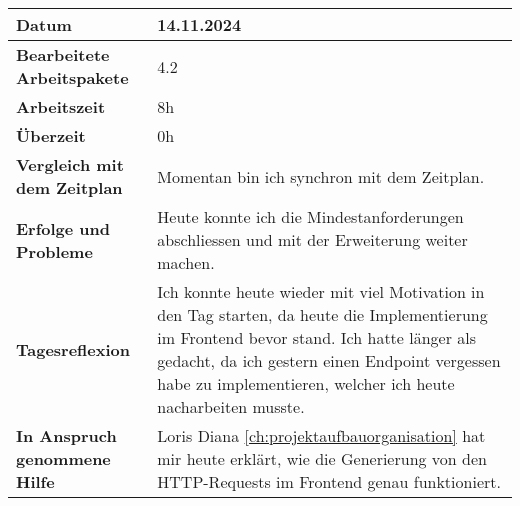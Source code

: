 \begin{longtable}{p{}|p{}}
	\hline
	\textbf{Datum}                       & 14.11.2024            \\
	\hline
	\textbf{Bearbeitete Arbeitspakete}   & 4.2                  \\
	\hline
	\textbf{Arbeitszeit}                 & 8h                                    \\
	\hline
	\textbf{Überzeit}                    & 0h                                    \\
	\hline
	\textbf{Vergleich mit dem Zeitplan}  & Momentan bin ich synchron mit dem Zeitplan. \\
	\hline
	\textbf{Erfolge und Probleme} & Heute konnte ich die Mindestanforderungen abschliessen und mit der Erweiterung weiter machen.
	\\
	\hline
	\textbf{Tagesreflexion} & Ich konnte heute wieder mit viel Motivation in den Tag starten, da heute die Implementierung im Frontend bevor stand. Ich hatte länger als gedacht, da ich gestern einen Endpoint vergessen habe zu implementieren, welcher ich heute nacharbeiten musste.
	\\
	\hline
	\textbf{In Anspruch genommene Hilfe} & Loris Diana \ref{ch:projektaufbauorganisation} hat mir heute erklärt, wie die Generierung von den HTTP-Requests im Frontend genau funktioniert.                              \\
	\hline
\end{longtable}\label{tab:arbeitsprotokoll-14.11.2024}
\newpage


